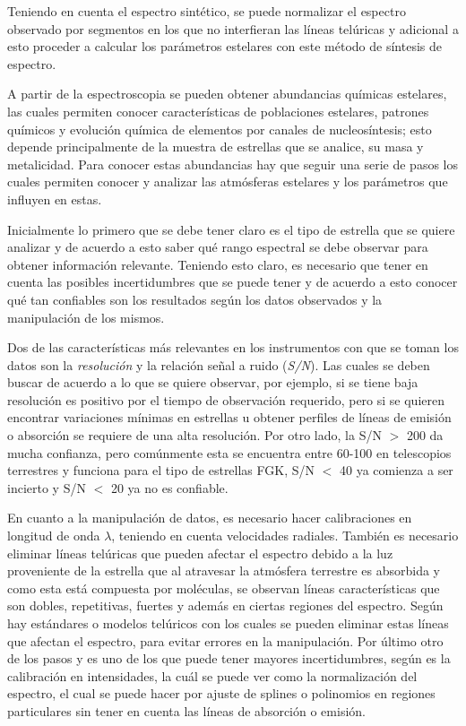 \documentclass[12pt,oneside,openany,letter]{book}
\begin{document}
\noindent Teniendo en cuenta el espectro sintético, se puede normalizar el espectro observado por segmentos en los que no interfieran las líneas telúricas y adicional a esto proceder a calcular los parámetros estelares con este método de síntesis de espectro.

\noindent A partir de la espectroscopia se pueden obtener abundancias químicas estelares, las cuales permiten conocer características de poblaciones estelares, patrones químicos y evolución química de elementos por canales de nucleosíntesis; esto depende principalmente de la muestra de estrellas que se analice, su masa y metalicidad. Para conocer estas abundancias hay que seguir una serie de pasos los cuales permiten conocer y analizar las atmósferas estelares y los parámetros que influyen en estas. 
\vspace{2mm}

\noindent Inicialmente lo primero que se debe tener claro es el tipo de estrella que se quiere analizar y de acuerdo a esto saber qué rango espectral se debe observar para obtener información relevante. Teniendo esto claro, es necesario que tener en cuenta las posibles incertidumbres que se puede tener y de acuerdo a esto conocer qué tan confiables son los resultados según los datos observados y la manipulación de los mismos.
\vspace{2mm}

\noindent Dos de las características más relevantes en los instrumentos con que se toman los datos son la \textit{resolución} y la relación señal a ruido (\textit{S/N}). Las cuales se deben buscar de acuerdo a lo que se quiere observar, por ejemplo, si se tiene baja resolución es positivo por el tiempo de observación requerido, pero si se quieren encontrar variaciones mínimas en estrellas u obtener perfiles de líneas de emisión o absorción se requiere de una alta resolución. Por otro lado, la S/N $>$ 200 da mucha confianza, pero comúnmente esta se encuentra entre 60-100 en telescopios terrestres y funciona para el tipo de estrellas FGK, S/N $<$ 40 ya comienza a ser incierto y S/N $<$ 20 ya no es confiable.
\vspace{2mm}

\noindent En cuanto a la manipulación de datos, es necesario hacer calibraciones en longitud de onda $\lambda$, teniendo en cuenta velocidades radiales. También es necesario eliminar líneas telúricas que pueden afectar el espectro debido a la luz proveniente de la estrella que al atravesar la atmósfera terrestre es absorbida y como esta está compuesta por moléculas, se observan líneas características que son dobles, repetitivas, fuertes y además en ciertas regiones del espectro. Según \citep{bertaux2014tapas} hay estándares o modelos telúricos con los cuales se pueden eliminar estas líneas que afectan el espectro, para evitar errores en la manipulación. Por último otro de los pasos y es uno de los que puede tener mayores incertidumbres, según \citep{jofre2017gaia} es la calibración en intensidades, la cuál se puede ver como la normalización del espectro, el cual se puede hacer por ajuste de splines o polinomios en regiones particulares sin tener en cuenta las líneas de absorción o emisión.
\vspace{2mm}
\end{document}
